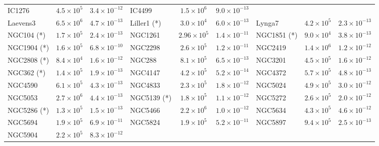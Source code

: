 \begin{table}
\begin{center}
\begin{tabular}{l | c | c | l |  c|   c | l | c | c }
                IC1276 &  $4.5\times10^5$ &          $3.4\times10^{-12}$ &
                IC4499 &  $1.5\times10^6$ &          $9.0\times10^{-13}$  \\
            Laevens3 &  $6.5\times10^6$ &          $4.7\times10^{-13}$  &
            Liller1 (*) &  $3.0\times10^4$ &          $6.0\times10^{-13}$  &
                Lynga7 &  $4.2\times10^5$ &         $ 2.3\times10^{-13}$  \\
                NGC104 (*) &  $1.7\times10^5$ &         $ 2.4\times10^{-13}$  &
            NGC1261 &  $2.96\times10^5$ &        $  1.4\times10^{-11}$  &
            NGC1851 (*) &  $9.0\times10^4$ &          $3.8\times10^{-13}$  \\
            NGC1904 (*) &  $1.6\times10^5$ &          $6.8\times10^{-10}$  &
            NGC2298 &  $2.6\times10^5$ &          $1.2\times10^{-11}$  &
            NGC2419 &  $1.4\times10^6$ &          $1.2\times10^{-12}$  \\
            NGC2808 (*) &  $8.4\times10^4$ &          $1.6\times10^{-12}$  &
                NGC288 &  $8.1\times10^5$ &          $6.5\times10^{-13}$  &
            NGC3201 &  $4.5\times10^5$ &         $ 1.6\times10^{-12}$ \\
                NGC362 (*) &  $1.4\times10^5$ &          $1.9\times10^{-13}$  &
            NGC4147 &  $4.2\times10^5$ &         $ 5.2\times10^{-14}$ &
            NGC4372 &  $5.7\times10^5$ &          $4.8\times10^{-13}$ \\
            NGC4590 &  $6.1\times10^5$ &          $4.3\times10^{-13}$ &
            NGC4833 &  $2.3\times10^5$ &          $1.8\times10^{-12}$  &
            NGC5024 &  $4.9\times10^5$ &          $3.0\times10^{-12}$  \\
            NGC5053 &  $2.7\times10^6$ &          $4.4\times10^{-13}$  &
            NGC5139 (*) &  $1.8\times10^5$ &          $1.1\times10^{-12}$ &
            NGC5272 &  $2.6\times10^5$ &          $2.0\times10^{-12}$  \\
            NGC5286 (*) &  $1.3\times10^5$ &          $1.5\times10^{-13}$ &
            NGC5466 &  $2.2\times10^6$ &          $1.0\times10^{-12}$  &
            NGC5634 &  $4.3\times10^5$ &          $4.6\times10^{-12}$  \\
            NGC5694 &  $1.9\times10^5$ &          $6.9\times10^{-11}$  &
            NGC5824 &  $1.9\times10^5$ &          $5.2\times10^{-11}$  &
            NGC5897 &  $9.4\times10^5$ &          $2.5\times10^{-13}$ \\
            NGC5904 &  $2.2\times10^5$ &          $8.3\times10^{-12}$  &

\end{tabular}
\end{center}
\end{table}
